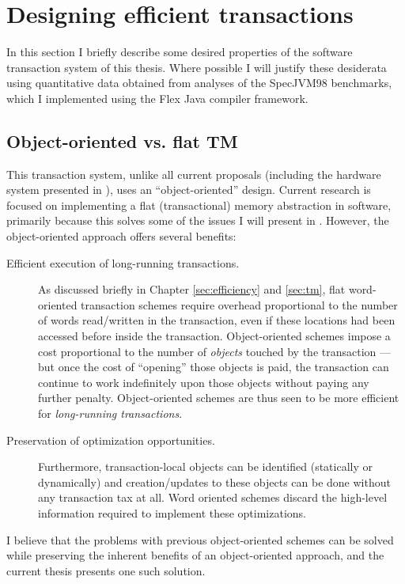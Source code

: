 \section{Designing efficient transactions}\label{sec:efficient}

In this section I briefly describe some desired properties of the
software transaction system of this thesis.  Where possible I will
justify these desiderata using quantitative data obtained from
analyses of the SpecJVM98 benchmarks, which I implemented using the
Flex Java compiler framework.

\subsection{Object-oriented vs. flat TM}
This transaction system, unlike all current proposals
\cite{HarrisFr03,HerlihyMo93} (including the
hardware system presented in ), uses an
``object-oriented'' design.  Current research is focused on
implementing a flat (transactional) memory abstraction in software,
primarily because this solves some of the issues I will present in
.  However, the object-oriented approach offers
several benefits:
\begin{description}
\item[Efficient execution of long-running transactions.]  As discussed
  briefly in Chapter \ref{sec:efficiency} and \ref{sec:tm}, flat
  word-oriented transaction schemes require overhead proportional to
  the number of words read/written in the transaction, even if these
  locations had been accessed before inside the transaction. Object-oriented
  schemes impose a cost proportional to the number of \emph{objects}
  touched by the transaction --- but once the cost of ``opening'' those
  objects is paid, the transaction can continue to work indefinitely
  upon those objects without paying any further penalty.
  Object-oriented schemes are thus seen to be more efficient for
  \emph{long-running transactions}.
\item[Preservation of optimization opportunities.]  Furthermore,
  transaction-local objects can be identified (statically or
  dynamically) and creation/updates to these objects can be done
  without any transaction tax at all.  Word oriented schemes discard
  the high-level information required to implement these optimizations.
\end{description}
I believe that the problems with previous object-oriented schemes can
be solved while preserving the inherent benefits of an object-oriented
approach, and the current thesis presents one such solution.

